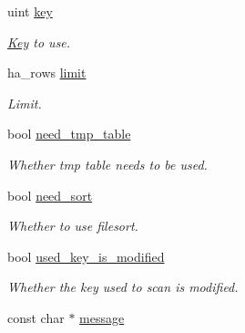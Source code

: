\begin{DoxyCompactItemize}
uint \mbox{\hyperlink{classModification__plan_a3a7a0ffc69f523bd67f2157f27431764}{key}}
\begin{DoxyCompactList}\small\item\em \mbox{\hyperlink{classKey}{Key}} to use. \end{DoxyCompactList}\item 
\mbox{\label{classModification__plan_a127e9ca01c01606f4265fb7629a85121}} 
ha\+\_\+rows \mbox{\hyperlink{classModification__plan_a127e9ca01c01606f4265fb7629a85121}{limit}}
\begin{DoxyCompactList}\small\item\em Limit. \end{DoxyCompactList}\item 
\mbox{\label{classModification__plan_aec1c918ee9a078a54d0bd8b70c98b7bc}} 
bool \mbox{\hyperlink{classModification__plan_aec1c918ee9a078a54d0bd8b70c98b7bc}{need\+\_\+tmp\+\_\+table}}
\begin{DoxyCompactList}\small\item\em Whether tmp table needs to be used. \end{DoxyCompactList}\item 
\mbox{\label{classModification__plan_a4f42c3bca33f86a95e15852fe15fa11c}} 
bool \mbox{\hyperlink{classModification__plan_a4f42c3bca33f86a95e15852fe15fa11c}{need\+\_\+sort}}
\begin{DoxyCompactList}\small\item\em Whether to use filesort. \end{DoxyCompactList}\item 
\mbox{\label{classModification__plan_ad3d9c4984dcc953b70eeb73db4fd2293}} 
bool \mbox{\hyperlink{classModification__plan_ad3d9c4984dcc953b70eeb73db4fd2293}{used\+\_\+key\+\_\+is\+\_\+modified}}
\begin{DoxyCompactList}\small\item\em Whether the key used to scan is modified. \end{DoxyCompactList}\item 
\mbox{\label{classModification__plan_af7a393bfeee3f670bfffda7b3f578122}} 
const char $\ast$ \mbox{\hyperlink{classModification__plan_af7a393bfeee3f670bfffda7b3f578122}{message}}

\end{DoxyCompactItemize}
